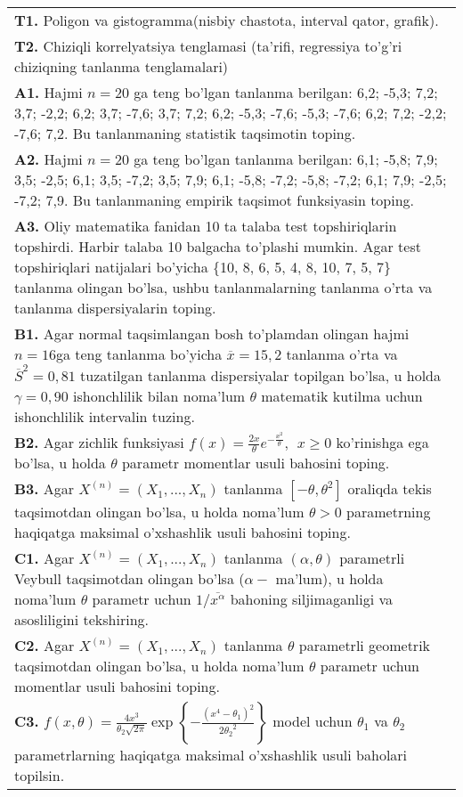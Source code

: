 \documentclass{article}
\begin{document}
\begin{tabular}{m{17cm}}
\textbf{T1.} 
Poligon va gistogramma(nisbiy chastota, interval qator, grafik).
\\
\textbf{T2.} 
Chiziqli korrelyatsiya tenglamasi (ta'rifi, regressiya to'g'ri chiziqning tanlanma tenglamalari)
\\
\textbf{A1.} 
Hajmi \(n = 20\) ga teng bo'lgan tanlanma berilgan: 6,2; -5,3; 7,2; 3,7; -2,2; 6,2; 3,7; -7,6; 3,7; 7,2; 6,2; -5,3; -7,6; -5,3; -7,6; 6,2; 7,2; -2,2; -7,6; 7,2. Bu tanlanmaning statistik taqsimotin toping.
\\
\textbf{A2.} 
Hajmi \(n = 20\) ga teng bo'lgan tanlanma berilgan: 6,1; -5,8; 7,9; 3,5; -2,5; 6,1; 3,5; -7,2; 3,5; 7,9; 6,1; -5,8; -7,2; -5,8; -7,2; 6,1; 7,9; -2,5; -7,2; 7,9. Bu tanlanmaning empirik taqsimot funksiyasin toping.
\\
\textbf{A3.} 
Oliy matematika fanidan 10 ta talaba test topshiriqlarin topshirdi. Harbir talaba 10 balgacha to'plashi mumkin. Agar test topshiriqlari natijalari bo'yicha \{10, 8, 6, 5, 4, 8, 10, 7, 5, 7\} tanlanma olingan bo'lsa, ushbu tanlanmalarning tanlanma o'rta va tanlanma dispersiyalarin toping.
\\
\textbf{B1.} 
Agar normal taqsimlangan bosh to'plamdan olingan hajmi \(n = 16\)ga teng tanlanma bo'yicha \(\overline{x} = 15,2\) tanlanma o'rta va \({\overline{S}}^{2} = 0,81\) tuzatilgan tanlanma dispersiyalar topilgan bo'lsa, u holda \(\gamma = 0,90\) ishonchlilik bilan noma'lum \(\theta\) matematik kutilma uchun ishonchlilik intervalin tuzing.
\\
\textbf{B2.} 
Agar zichlik funksiyasi \(f(x) = \frac{2x}{\theta}e^{- \frac{x^{2}}{\theta}},\ \ x \geq 0\) ko'rinishga ega bo'lsa, u holda \(\theta\) parametr momentlar usuli bahosini toping.
\\
\textbf{B3.} 
Agar \(X^{(n)} = \left( X_{1},...,X_{n} \right)\) tanlanma \(\left\lbrack - \theta,\theta^{2} \right\rbrack\) oraliqda tekis taqsimotdan olingan bo'lsa, u holda noma'lum \(\theta > 0\) parametrning haqiqatga maksimal o'xshashlik usuli bahosini toping.
\\
\textbf{C1.} 
Agar \(X^{(n)} = \left( X_{1},...,X_{n} \right)\) tanlanma \((\alpha,\theta)\) parametrli Veybull taqsimotdan olingan bo'lsa (\(\alpha -\) ma'lum), u holda noma'lum \(\theta\) parametr uchun \(1/\overline{x^{\alpha}}\) bahoning siljimaganligi va asosliligini tekshiring.
\\
\textbf{C2.} 
Agar \(X^{(n)} = \left( X_{1},...,X_{n} \right)\) tanlanma \(\theta\) parametrli geometrik taqsimotdan olingan bo'lsa, u holda noma'lum \(\theta\) parametr uchun momentlar usuli bahosini toping.
\\
\textbf{C3.} 
\(f(x,\theta) = \frac{4x^{3}}{\theta_{2}\sqrt{2\pi}}\exp\left\{ - \frac{\left( x^{4} - \theta_{1} \right)^{2}}{2{\theta_{2}}^{2}} \right\}\) model uchun \(\theta_{1}\) va \(\theta_{2}\) parametrlarning haqiqatga maksimal o'xshashlik usuli baholari topilsin.
\\

\end{tabular}
\vspace{1cm}
\end{document}
